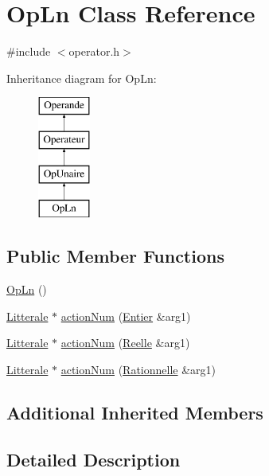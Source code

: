 \hypertarget{class_op_ln}{}\section{Op\+Ln Class Reference}
\label{class_op_ln}


{\ttfamily \#include $<$operator.\+h$>$}

Inheritance diagram for Op\+Ln\+:\begin{figure}[H]
\begin{center}
\leavevmode
\includegraphics[height=4.000000cm]{class_op_ln}
\end{center}
\end{figure}
\subsection*{Public Member Functions}
\begin{DoxyCompactItemize}
\item 
\hyperlink{class_op_ln_a30eaaf55b82d7309ca24ff96a393919e}{Op\+Ln} ()
\item 
\hyperlink{class_litterale}{Litterale} $\ast$ \hyperlink{class_op_ln_af3ccbade0164af76ae941400b7bbe6ce}{action\+Num} (\hyperlink{class_entier}{Entier} \&arg1)
\item 
\hyperlink{class_litterale}{Litterale} $\ast$ \hyperlink{class_op_ln_a3fd161533906f6e658aa9cdc1512bd01}{action\+Num} (\hyperlink{class_reelle}{Reelle} \&arg1)
\item 
\hyperlink{class_litterale}{Litterale} $\ast$ \hyperlink{class_op_ln_abba32df08a1aad16a84eac0c95c9fd76}{action\+Num} (\hyperlink{class_rationnelle}{Rationnelle} \&arg1)
\end{DoxyCompactItemize}
\subsection*{Additional Inherited Members}


\subsection{Detailed Description}


